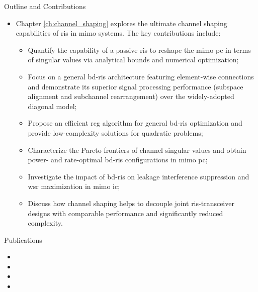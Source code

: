 \begin{section}{Outline and Contributions}
\begin{itemize}
\begin{itemize}
			\item Unify \gls{ris} and \gls{bc} as one battery-free cognitive radio called RIScatter, where dispersed or co-located scatter nodes ride over an active primary link to modulate their own information and engineering the legacy channel simultaneously;
			\item Integrate backscatter modulation and passive beamforming seamlessly into the input distribution design that allows arbitrary trade-off in between;
			\item Propose a low-complexity cooperative receiver that sequentially decodes both coexisting links and exploits backscatter detection as part of channel training;
			\item Characterize the achievable primary-backscatter rate region over different designs of input distribution at the scatter nodes, active beamforming at the \gls{ap}, and energy detector at the receiver;
			\item Discuss the impact of practical factors such as the number of scatter nodes and states, transmit antenna size, backscatter symbol duration, and \gls{snr} on the system performance.
		\end{itemize}
		\item Chapter \ref{ch:channel_shaping} explores the ultimate channel shaping capabilities of \gls{ris} in \gls{mimo} systems. The key contributions include:
		\begin{itemize}
			\item Quantify the capability of a passive \gls{ris} to reshape the \gls{mimo} \gls{pc} in terms of singular values via analytical bounds and numerical optimization;
			\item Focus on a general \gls{bd}-\gls{ris} architecture featuring element-wise connections and demonstrate its superior signal processing performance (subspace alignment and subchannel rearrangement) over the widely-adopted diagonal model;
			\item Propose an efficient \gls{rcg} algorithm for general \gls{bd}-\gls{ris} optimization and provide low-complexity solutions for quadratic problems;
			\item Characterize the Pareto frontiers of channel singular values and obtain power- and rate-optimal \gls{bd}-\gls{ris} configurations in \gls{mimo} \gls{pc};
			\item Investigate the impact of \gls{bd}-\gls{ris} on leakage interference suppression and \gls{wsr} maximization in \gls{mimo} \gls{ic};
			\item Discuss how channel shaping helps to decouple joint \gls{ris}-transceiver designs with comparable performance and significantly reduced complexity.
		\end{itemize}
	\end{itemize}
\end{section}

\begin{section}{Publications}
	\begin{itemize}
		\item {}
		\item {}
		\item {}
		\item {}
	\end{itemize}
\end{section}

